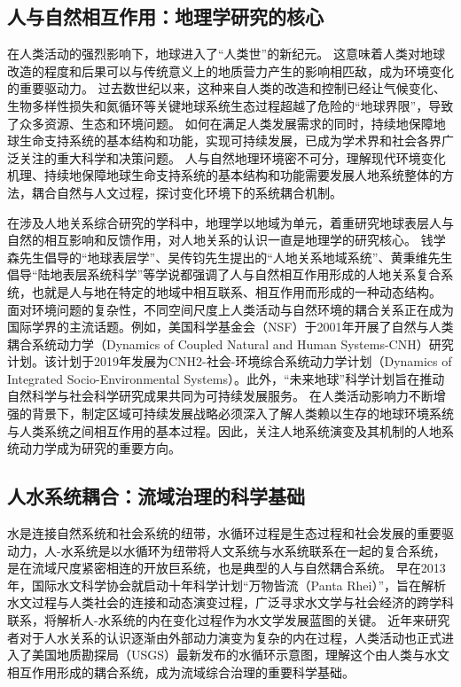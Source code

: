 \subsection{人与自然相互作用：地理学研究的核心}

在人类活动的强烈影响下，地球进入了“人类世”的新纪元。
这意味着人类对地球改造的程度和后果可以与传统意义上的地质营力产生的影响相匹敌，成为环境变化的重要驱动力\cite{lenton2019, lewis2015, lewis2018}。
过去数世纪以来，这种来自人类的改造和控制已经让气候变化、生物多样性损失和氮循环等关键地球系统生态过程超越了危险的“地球界限”，导致了众多资源、生态和环境问题\cite{steffen2015}。
如何在满足人类发展需求的同时，持续地保障地球生命支持系统的基本结构和功能，实现可持续发展，已成为学术界和社会各界广泛关注的重大科学和决策问题\cite{wu2014}。
人与自然地理环境密不可分，理解现代环境变化机理、持续地保障地球生命支持系统的基本结构和功能需要发展人地系统整体的方法，耦合自然与人文过程，探讨变化环境下的系统耦合机制\cite{fu2015}。

在涉及人地关系综合研究的学科中，地理学以地域为单元，着重研究地球表层人与自然的相互影响和反馈作用，对人地关系的认识一直是地理学的研究核心\cite{wu1991}。
钱学森先生倡导的“地球表层学”、吴传钧先生提出的“人地关系地域系统”、黄秉维先生倡导“陆地表层系统科学”等学说都强调了人与自然相互作用形成的人地关系复合系统，也就是人与地在特定的地域中相互联系、相互作用而形成的一种动态结构。
面对环境问题的复杂性，不同空间尺度上人类活动与自然环境的耦合关系正在成为国际学界的主流话题。例如，美国科学基金会（NSF）于2001年开展了自然与人类耦合系统动力学（Dynamics of Coupled Natural and Human Systems-CNH）研究计划。该计划于2019年发展为CNH2-社会-环境综合系统动力学计划（Dynamics of Integrated Socio-Environmental Systems）。此外，“未来地球”科学计划旨在推动自然科学与社会科学研究成果共同为可持续发展服务\cite{fu2015}。
在人类活动影响力不断增强的背景下，制定区域可持续发展战略必须深入了解人类赖以生存的地球环境系统与人类系统之间相互作用的基本过程。因此，关注人地系统演变及其机制的人地系统动力学成为研究的重要方向\cite{fu2022}。

\subsection{人水系统耦合：流域治理的科学基础}

水是连接自然系统和社会系统的纽带，水循环过程是生态过程和社会发展的重要驱动力，人-水系统是以水循环为纽带将人文系统与水系统联系在一起的复合系统，是在流域尺度紧密相连的开放巨系统，也是典型的人与自然耦合系统\cite{li2007}。
早在2013年，国际水文科学协会就启动十年科学计划“万物皆流（Panta Rhei）”，旨在解析水文过程与人类社会的连接和动态演变过程\cite{montanari2013}，广泛寻求水文学与社会经济的跨学科联系，将解析人-水系统的内在变化过程作为水文学发展蓝图的关键。
近年来研究者对于人水关系的认识逐渐由外部动力演变为复杂的内在过程，人类活动也正式进入了美国地质勘探局（USGS）最新发布的水循环示意图\cite{abbott2019, abbott2019a}，理解这个由人类与水文相互作用形成的耦合系统，成为流域综合治理的重要科学基础。

